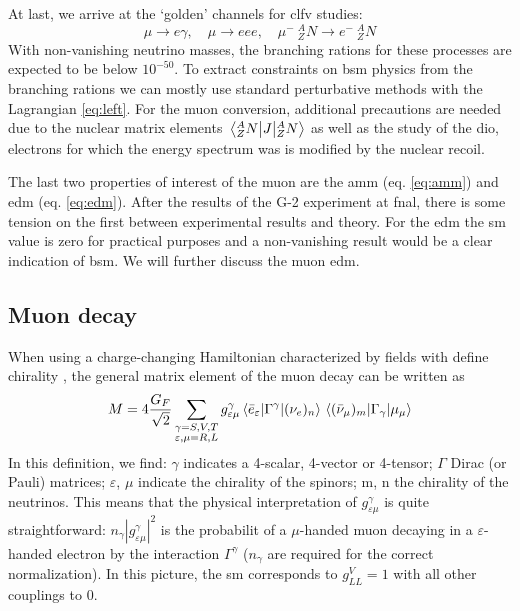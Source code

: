 \begin{refsection}
        At last, we arrive at the `golden' channels for \gls{clfv} studies:
        \begin{equation}
            \mu\rightarrow e\gamma, \quad \mu\rightarrow eee, \quad \mu^- \ ^A_ZN\rightarrow e^-\ ^A_ZN
        \end{equation}    
        With non-vanishing neutrino masses, the branching rations for these processes are expected to be below $10^{-50}$.
        To extract constraints on \gls{bsm} physics from the branching rations we can mostly use standard perturbative methods with the Lagrangian \ref{eq:left}.
        For the muon conversion, additional precautions are needed due to the nuclear matrix elements $\matrixel{^A_ZN}{J}{^A_ZN}$ as well as the study of the \gls{dio}, electrons for which the energy spectrum was is modified by the nuclear recoil.
        
        The last two properties of interest of the muon are the \gls{amm} (eq. \ref{eq:amm}) and \gls{edm} (eq. \ref{eq:edm}). 
        After the results of the G-2 experiment at \gls{fnal}, there is some tension on the first between experimental results and theory. 
        For the \gls{edm} the \gls{sm} value is zero for practical purposes and a non-vanishing result would be a clear indication of \gls{bsm}.
        We will further discuss the muon \gls{edm}.

    \subsection{Muon decay}
        When using a charge-changing Hamiltonian characterized by fields with define chirality \cite{5}, the general matrix element of the muon decay can be written as \cite{7}
        \begin{equation}
            M=4\frac{G_F}{\sqrt{2}}\sum_{\substack{ \gamma = S,V,T \\ \varepsilon,\mu = R,L}}g^\gamma_{\varepsilon\mu} \matrixel{\bar{e}_\varepsilon}{\Gamma^\gamma}{(\nu_e)_n} \matrixel{(\bar{\nu}_\mu)_m}{\Gamma_\gamma}{\mu_\mu}
        \end{equation}
        In this definition, we find: $\gamma$ indicates a 4-scalar, 4-vector or 4-tensor; $\Gamma$ Dirac (or Pauli) matrices; $\varepsilon$, $\mu$ indicate the chirality of the spinors; m, n the chirality of the neutrinos.
        This means that the physical interpretation of $g^\gamma_{\varepsilon\mu}$ is quite straightforward: $n_\gamma|g^\gamma_{\varepsilon\mu}|^2$ is the probabilit of a $\mu$-handed muon decaying in a $\varepsilon$-handed electron by the interaction $\Gamma^\gamma$ ($n_\gamma$ are required for the correct normalization).
        In this picture, the \gls{sm} corresponds to $g_{LL}^V=1$ with all other couplings to 0.
        

\end{refsection}
